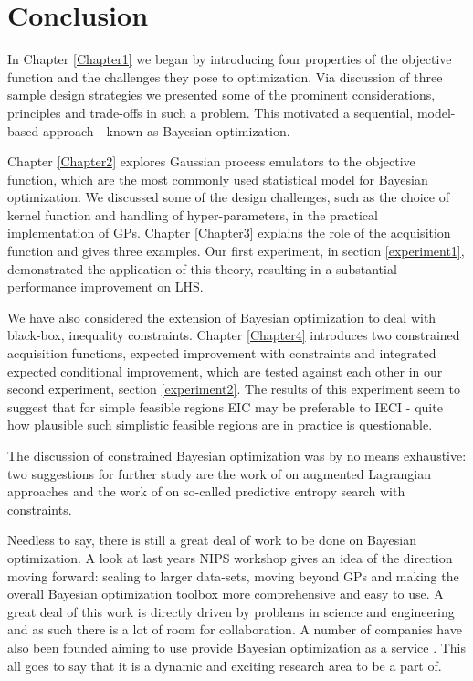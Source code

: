 
\chapter{Conclusion} %

\label{Chapter6} %


In Chapter \ref{Chapter1} we began by introducing four properties of the objective function and the challenges they pose to optimization. Via discussion of three sample design strategies we presented some of the prominent considerations, principles and trade-offs in such a problem. This motivated a sequential, model-based approach - known as Bayesian optimization. 

Chapter \ref{Chapter2} explores Gaussian process emulators to the objective function, which are the most commonly used statistical model for Bayesian optimization. We discussed some of the design challenges, such as the choice of kernel function and handling of hyper-parameters, in the practical implementation of GPs. Chapter \ref{Chapter3} explains the role of the acquisition function and gives three examples. Our first experiment, in section \ref{experiment1}, demonstrated the application of this theory, resulting in a substantial performance improvement on LHS.

We have also considered the extension of Bayesian optimization to deal with black-box, inequality constraints. Chapter \ref{Chapter4} introduces two constrained acquisition functions, expected improvement with constraints and integrated expected conditional improvement, which are tested against each other in our second experiment, section \ref{experiment2}. The results of this experiment seem to suggest that for simple feasible regions EIC may be preferable to IECI - quite how plausible such simplistic feasible regions are in practice is questionable. 

The discussion of constrained Bayesian optimization was by no means exhaustive: two suggestions for further study are the work of \citet{gramacy2016modeling} on augmented Lagrangian approaches and the work of \citet{hernandez2015predictive} on so-called predictive entropy search with constraints.

Needless to say, there is still a great deal of work to be done on Bayesian optimization. A look at last years NIPS workshop \cite{nips} gives an idea of the direction moving forward: scaling to larger data-sets, moving beyond GPs and making the overall Bayesian optimization toolbox more comprehensive and easy to use. A great deal of this work is directly driven by problems in science and engineering and as such there is a lot of room for collaboration. A number of companies have also been founded aiming to use provide Bayesian optimization as a service \cite{osborne2018}. This all goes to say that it is a dynamic and exciting research area to be a part of. 


